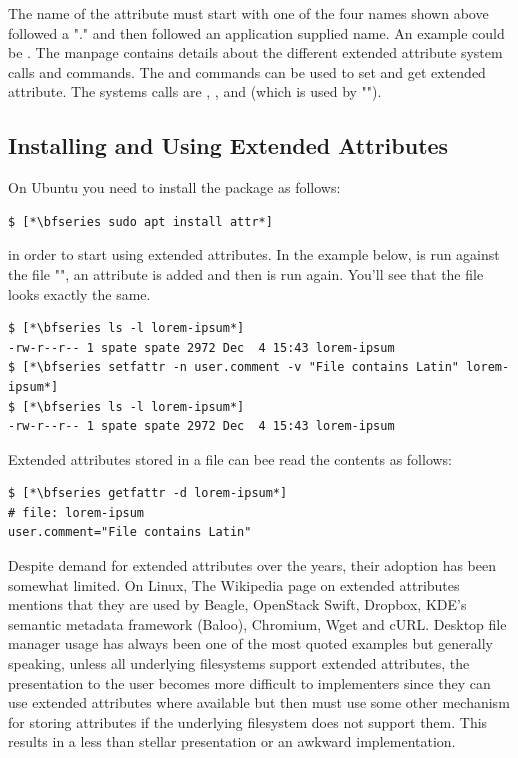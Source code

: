 \noindent
The name of the attribute must start with one of the four names shown above followed a "." and then followed an application supplied name. An example could be . The  manpage contains details about the different extended attribute system calls and commands. The  and  commands can be used to set and get extended attribute. The systems calls are , ,  and  (which is used by "").

\subsection{Installing and Using Extended Attributes}

On Ubuntu you need to install the  package as follows:

\begin{lstlisting}
$ [*\bfseries sudo apt install attr*]
\end{lstlisting}

\noindent
in order to start using extended attributes. In the example below,  is run against the file "", an attribute is added and then  is run again. You'll see that the file looks exactly the same.

\begin{lstlisting}
$ [*\bfseries ls -l lorem-ipsum*]
-rw-r--r-- 1 spate spate 2972 Dec  4 15:43 lorem-ipsum
$ [*\bfseries setfattr -n user.comment -v "File contains Latin" lorem-ipsum*]
$ [*\bfseries ls -l lorem-ipsum*]
-rw-r--r-- 1 spate spate 2972 Dec  4 15:43 lorem-ipsum
\end{lstlisting}

\noindent
Extended attributes stored in a file can bee read the contents as follows:

\begin{lstlisting}
$ [*\bfseries getfattr -d lorem-ipsum*]
# file: lorem-ipsum
user.comment="File contains Latin"
\end{lstlisting}

\noindent
Despite demand for extended attributes over the years, their adoption has been somewhat limited. On Linux, The Wikipedia page on extended attributes mentions that they are used by Beagle, OpenStack Swift, Dropbox, KDE's semantic metadata framework (Baloo), Chromium, Wget and cURL. Desktop file manager usage has always been one of the most quoted examples but generally speaking, unless all underlying filesystems support extended attributes, the presentation to the user becomes more difficult to implementers since they can use extended attributes where available but then must use some other mechanism for storing attributes if the underlying filesystem does not support them. This results in a less than stellar presentation or an awkward implementation.

